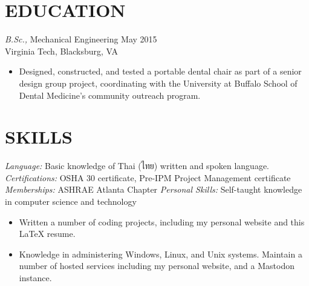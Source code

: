 \documentclass[margin]{res}
\begin{document}
\begin{resume}
\section{EDUCATION} {\sl B.Sc.,} Mechanical Engineering \hfill  May 2015 \\
    Virginia Tech, Blacksburg, VA
    \begin{itemize}  \itemsep -2pt %
        \item Designed, constructed, and tested a portable dental chair as part of a senior design group project, coordinating with the University at Buffalo School of Dental Medicine's community outreach program.
    \end{itemize}

\section{SKILLS}
    {\sl Language:} Basic knowledge of Thai (ไทย) written and spoken language. \\
    {\sl Certifications:} OSHA 30 certificate, Pre-IPM Project Management certificate
    {\sl Memberships:} ASHRAE Atlanta Chapter
    {\sl Personal Skills:} Self-taught knowledge in computer science and technology
    \begin{itemize} \itemsep -2pt
    \item Written a number of coding projects, including my personal website and this \LaTeX{} resume. 
    \item Knowledge in administering Windows, Linux, and Unix systems. Maintain a number of hosted services including my personal website, and a Mastodon instance.
    \end{itemize}

\end{resume}
\end{document}
